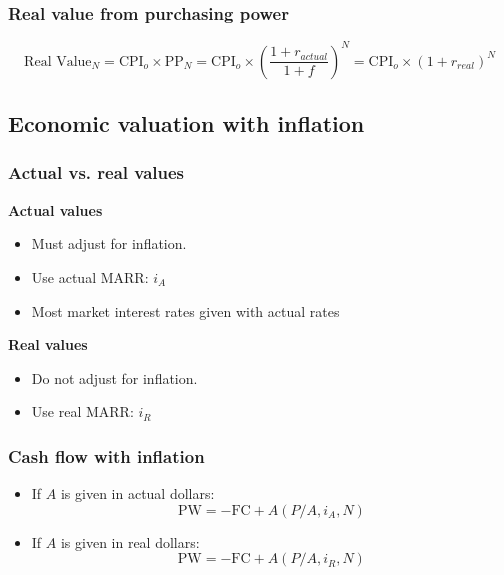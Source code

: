 \subsubsection{Real value from purchasing power}
    \begin{definition}
        \begin{equation}
            \text{Real Value}_N = \text{CPI}_o \times \text{PP}_N = \text{CPI}_o \times \left (\frac{1 + r_{actual}}{1 + f} \right)^N = \text{CPI}_o \times (1 + r_{real})^N
        \end{equation}        
    \end{definition}

\subsection{Economic valuation with inflation}
\subsubsection{Actual vs. real values}
    \begin{definition}

        \textbf{Actual values}
            \begin{itemize}
                \item Must adjust for inflation. 
                \item Use actual MARR: \(i_A\)
                \item Most market interest rates given with actual rates
            \end{itemize}
        \textbf{Real values}
            \begin{itemize}
                \item Do not adjust for inflation. 
                \item Use real MARR: \(i_R\) 
            \end{itemize}
    \end{definition}
\subsubsection{Cash flow with inflation}
    \begin{definition}
        \begin{itemize}
            \item If \(A\) is given in actual dollars:
            \begin{equation}
                \text{PW} = -\text{FC} + A (P/A, i_A, N)
            \end{equation}
        
            \item If \(A\) is given in real dollars:
            \begin{equation}
                \text{PW} = -\text{FC} + A (P/A, i_R, N)
            \end{equation}
        \end{itemize}
    \end{definition}

